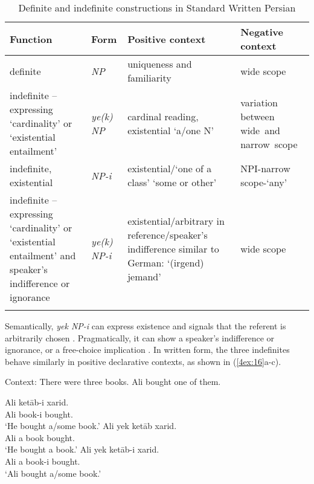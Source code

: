 \documentclass[output=paper]{langsci/langscibook}
\begin{document}
\begin{table}
{{
\begin{tabularx}{\textwidth}{>{\raggedright}p{4cm}@{~}l>{\raggedright}Q@{~}p{1.9cm}}
\lsptoprule
Function & Form & Positive context & {Negative context}\\
\midrule 
definite & {\emph{NP}} & uniqueness and familiarity & wide scope \\
\tablevspace
indefinite -- expressing  `cardinality' or `existential entailment' 	& {\emph{ye(k) NP}} 		& cardinal reading,  existential `a/one N'			& variation between \mbox{wide and} \mbox{narrow scope} \\
\tablevspace
indefinite, existential 		& {\emph{NP-i}}		& existential/`one of a class'  `some or other'	& \mbox{NPI-narrow} \mbox{scope-`any'}\ \\
\tablevspace
indefinite -- expressing `cardinality' or  	`existential entailment' and speaker's indifference or ignorance 		& {\emph{ye(k) NP-i}}	& existential/arbitrary in reference/speaker’s	  indifference similar	 to German: `(irgend) jemand'	& wide scope \\
\lspbottomrule
\end{tabularx}
}}
\caption{{Definite and indefinite constructions in Standard Written Persian}}\label{4table:2}
\end{table}

{
\largerpage
Semantically, {\emph{yek NP-i}} can express existence and signals that the referent is arbitrarily chosen \citep{lyons:99}. Pragmatically, it can show a speaker's indifference or ignorance, or a free-choice implication \citep{jasbi:16}. In written form, the three indefinites behave similarly in positive declarative contexts, as shown in (\ref{4ex:16}a-c).
}

\newpage
\begin{exe}
\ex\label{4ex:16}
Context: There were three books. Ali bought one of them.
	\begin{xlista}
	\ex\label{4ex:16a}
	\gll	Ali  	ketāb-i  	xarid. \\
		Ali  	book-i  	bought.{} \\
	\glt	`He bought a/some book.'
	\ex\label{4ex:16b}
        	\gll	Ali  	yek ketāb   	xarid. \\
		Ali   	a     book    	bought.{} \\
	\glt	`He bought a book.'
	\ex\label{4ex:16c}
        	\gll	Ali  	yek ketāb-i 	xarid. \\
		Ali  	a     book-i   	bought.{} \\
	\glt	`Ali bought a/some book.'
	\end{xlista}
\end{exe}
\end{document}
